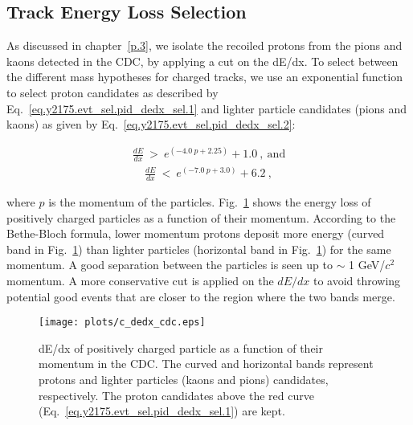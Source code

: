 \subsection{Track Energy Loss Selection}
\label{chap.y2175.evt_sel.pid_dedx_sel}

As discussed in chapter~\ref{p.3}, we isolate the recoiled protons from the pions and kaons detected in the CDC, by applying a cut on the dE/dx. To select between the different mass hypotheses for charged tracks, we use an exponential function to select proton candidates as described by Eq.~\ref{eq.y2175.evt_sel.pid_dedx_sel.1} and lighter particle candidates (pions and kaons) as given by Eq.~\ref{eq.y2175.evt_sel.pid_dedx_sel.2}:

\begin{equation}
    \begin{aligned}
        \label{eq.y2175.evt_sel.pid_dedx_sel.1}
        \frac{dE}{dx}~>~e^{(-4.0~p + 2.25)} + 1.0~,~\mathrm{and}
    \end{aligned}
\end{equation}
\begin{equation}
    \begin{aligned}
        \label{eq.y2175.evt_sel.pid_dedx_sel.2}
        \frac{dE}{dx}~<~e^{(-7.0~p + 3.0)} + 6.2~,
    \end{aligned}
\end{equation}

where $p$ is the momentum of the particles.
Fig.~\ref{fig.y2175.evt_sel.pid_dedx_sel} shows the energy loss of positively charged particles as a function of their momentum. According to the Bethe-Bloch formula, lower momentum protons deposit more energy (curved band in Fig.~\ref{fig.y2175.evt_sel.pid_dedx_sel}) than lighter particles (horizontal band in Fig.~\ref{fig.y2175.evt_sel.pid_dedx_sel}) for the same momentum. A good separation between the particles is seen up to $\sim$ 1 GeV/$c^{2}$ momentum. A more conservative cut is applied on the $dE/dx$ to avoid throwing potential good events that are closer to the region where the two bands merge.

\begin{figure}[H]
    \centering
        \texttt{[image: plots/c\_dedx\_cdc.eps]}
        \caption{dE/dx of positively charged particle as a function of their momentum in the CDC. The curved and horizontal bands represent protons and lighter particles (kaons and pions) candidates, respectively. The proton candidates above the red curve (Eq.~\ref{eq.y2175.evt_sel.pid_dedx_sel.1}) are kept.}
        \label{fig.y2175.evt_sel.pid_dedx_sel}
\end{figure}

